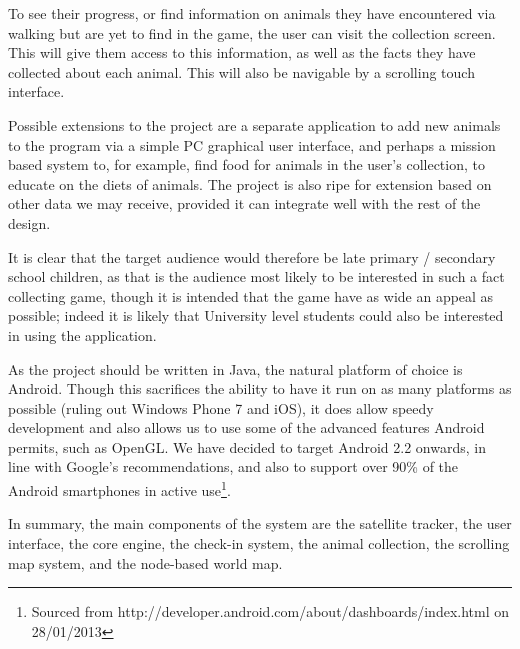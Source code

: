 \documentclass[]{report}
\begin{document}
To see their progress, or find information on animals they have encountered via walking but are yet to find in the game, the user can visit the collection screen. This will give them access to this information, as well as the facts they have collected about each animal. This will also be navigable by a scrolling touch interface.

Possible extensions to the project are a separate application to add new animals to the program via a simple PC graphical user interface, and perhaps a mission based system to, for example, find food for animals in the user's collection, to educate on the diets of animals. The project is also ripe for extension based on other data we may receive, provided it can integrate well with the rest of the design.

It is clear that the target audience would therefore be late primary / secondary school children, as that is the audience most likely to be interested in such a fact collecting game, though it is intended that the game have as wide an appeal as possible; indeed it is likely that University level students could also be interested in using the application.

As the project should be written in Java, the natural platform of choice is Android. Though this sacrifices the ability to have it run on as many platforms as possible (ruling out Windows Phone 7 and iOS), it does allow speedy development and also allows us to use some of the advanced features Android permits, such as OpenGL. We have decided to target Android 2.2 onwards, in line with Google's recommendations, and also to support over 90\% of the Android smartphones in active use\footnote{Sourced from http://developer.android.com/about/dashboards/index.html on 28/01/2013}.

In summary, the main components of the system are the satellite tracker, the user interface, the core engine, the check-in system, the animal collection, the scrolling map system, and the node-based world map.
\end{document}
